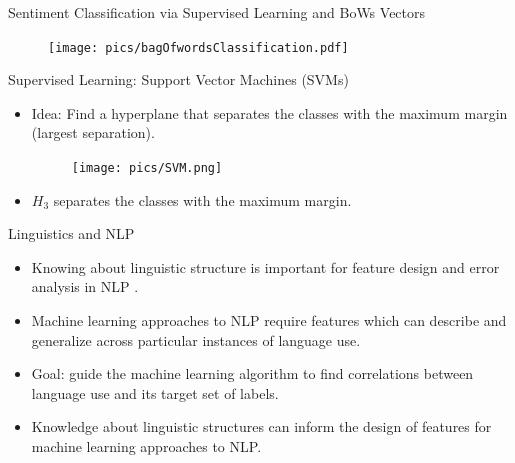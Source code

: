 \documentclass[handout]{beamer}
\begin{document}
\begin{frame}{Sentiment Classification via Supervised Learning and BoWs Vectors}

\begin{figure}[h]
        	\texttt{[image: pics/bagOfwordsClassification.pdf]}
        \end{figure}

\end{frame}




\begin{frame}{Supervised Learning: Support Vector Machines (SVMs)}
\begin{scriptsize}

\begin{itemize}


\item Idea: Find a hyperplane that separates the classes with the maximum margin (largest separation). 

     \begin{figure}[h]
        	\texttt{[image: pics/SVM.png]}
        \end{figure}

\item   
$H_3$ separates the classes with the maximum margin. 

\end{itemize}

   
\end{scriptsize}

\end{frame}

\begin{frame}{Linguistics and NLP}
\begin{scriptsize}
  \begin{itemize}
   \item Knowing about linguistic structure is important for feature design
and error analysis in NLP \cite{bender2013linguistic}.

\item Machine learning approaches to NLP require features which can describe and generalize across particular instances of language use.
\item Goal: guide the machine learning algorithm to find correlations between language use and its target set of labels.
\item Knowledge about linguistic structures can inform the design of
features for machine learning approaches to NLP.
  \end{itemize}
\end{scriptsize}

 
\end{frame}
\end{document}
